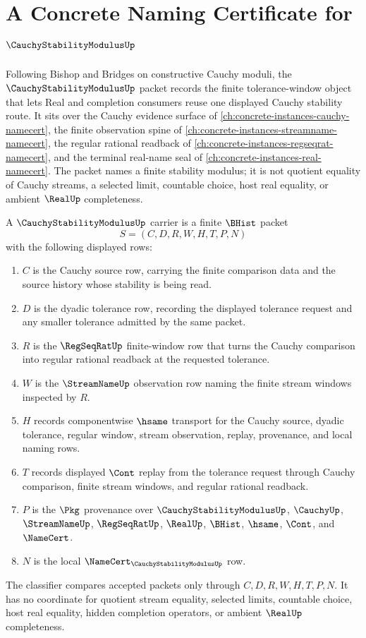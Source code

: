 \chapter{A Concrete Naming Certificate for $\CauchyStabilityModulusUp$}
\label{ch:concrete-instances-cauchy-stability-modulus-namecert}

Following Bishop and Bridges on constructive Cauchy moduli, the $\CauchyStabilityModulusUp$ packet records the finite tolerance-window object that lets Real and completion consumers reuse one displayed Cauchy stability route. It sits over the Cauchy evidence surface of \autoref{ch:concrete-instances-cauchy-namecert}, the finite observation spine of \autoref{ch:concrete-instances-streamname-namecert}, the regular rational readback of \autoref{ch:concrete-instances-regseqrat-namecert}, and the terminal real-name seal of \autoref{ch:concrete-instances-real-namecert}. The packet names a finite stability modulus; it is not quotient equality of Cauchy streams, a selected limit, countable choice, host real equality, or ambient $\RealUp$ completeness.

\begin{definition}
\label{def:cauchy-stability-modulus-carrier}
A $\CauchyStabilityModulusUp$ carrier is a finite $\BHist$ packet
$$
S=(C,D,R,W,H,T,P,N)
$$
with the following displayed rows:
\begin{enumerate}
\item $C$ is the Cauchy source row, carrying the finite comparison data and the source history whose stability is being read.
\item $D$ is the dyadic tolerance row, recording the displayed tolerance request and any smaller tolerance admitted by the same packet.
\item $R$ is the $\RegSeqRatUp$ finite-window row that turns the Cauchy comparison into regular rational readback at the requested tolerance.
\item $W$ is the $\StreamNameUp$ observation row naming the finite stream windows inspected by $R$.
\item $H$ records componentwise $\hsame$ transport for the Cauchy source, dyadic tolerance, regular window, stream observation, replay, provenance, and local naming rows.
\item $T$ records displayed $\Cont$ replay from the tolerance request through Cauchy comparison, finite stream windows, and regular rational readback.
\item $P$ is the $\Pkg$ provenance over $\CauchyStabilityModulusUp$, $\CauchyUp$, $\StreamNameUp$, $\RegSeqRatUp$, $\RealUp$, $\BHist$, $\hsame$, $\Cont$, and $\NameCert$.
\item $N$ is the local $\NameCert_{\CauchyStabilityModulusUp}$ row.
\end{enumerate}
The classifier compares accepted packets only through $C,D,R,W,H,T,P,N$. It has no coordinate for quotient stream equality, selected limits, countable choice, host real equality, hidden completion operators, or ambient $\RealUp$ completeness.
\end{definition}

